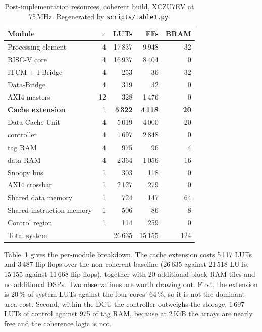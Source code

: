 \documentclass[conference]{IEEEtran}
\begin{document}
\begin{table}[t]
\caption{Post-implementation resources, coherent build, XCZU7EV at 75\,MHz.
Regenerated by \texttt{scripts/table1.py}.}
\label{tab:resources}
\centering
\begin{tabular}{@{}lrrrr@{}}
\toprule
Module & $\times$ & LUTs & FFs & BRAM \\
\midrule
Processing element        & 4  & 17\,837 & 9\,948 & 32 \\
\quad RISC-V core         & 4  & 16\,937 & 8\,404 & 0 \\
\quad ITCM + I-Bridge     & 4  & 253     & 36     & 32 \\
\quad Data-Bridge         & 4  & 319     & 32     & 0 \\
\quad AXI4 masters        & 12 & 328     & 1\,476 & 0 \\
\addlinespace
\textbf{Cache extension}  & 1  & \textbf{5\,322} & \textbf{4\,118} & \textbf{20} \\
\quad Data Cache Unit     & 4  & 5\,019  & 4\,000 & 20 \\
\quad\quad controller     & 4  & 1\,697  & 2\,848 & 0 \\
\quad\quad tag RAM        & 4  & 975     & 96     & 4 \\
\quad\quad data RAM       & 4  & 2\,364  & 1\,056 & 16 \\
\quad Snoopy bus          & 1  & 303     & 118    & 0 \\
\addlinespace
AXI4 crossbar             & 1  & 2\,127  & 279    & 0 \\
Shared data memory        & 1  & 724     & 147    & 64 \\
Shared instruction memory & 1  & 506     & 86     & 8 \\
Control region            & 1  & 114     & 259    & 0 \\
\midrule
Total system              &    & 26\,635 & 15\,155 & 124 \\
\bottomrule
\end{tabular}
\end{table}

Table~\ref{tab:resources} gives the per-module breakdown. The cache extension
costs 5\,117 LUTs and 3\,487 flip-flops over the non-coherent baseline
(26\,635 against 21\,518 LUTs, 15\,155 against 11\,668 flip-flops), together
with 20 additional block RAM tiles and no additional DSPs. Two observations are
worth drawing out. First, the extension is 20\,\% of system LUTs against the
four cores' 64\,\%, so it is not the dominant area cost. Second, within the DCU
the controller outweighs the storage, 1\,697 LUTs of control against 975 of tag
RAM, because at 2\,KiB the arrays are nearly free and the coherence logic is
not.
\end{document}
